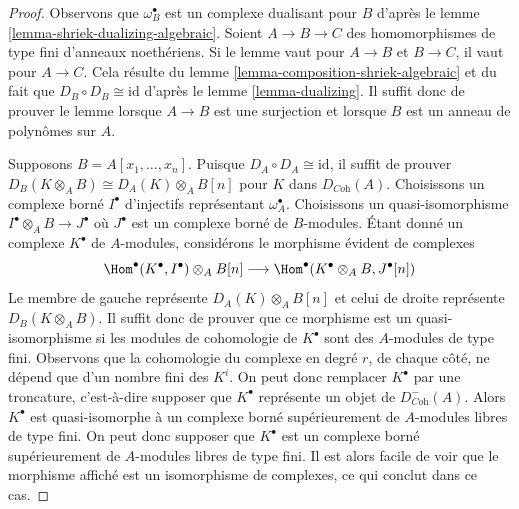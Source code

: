 \begin{proof}
Observons que $\omega_B^\bullet$ est un complexe dualisant pour $B$ d'après le lemme \ref{lemma-shriek-dualizing-algebraic}.
Soient $A \to B \to C$ des homomorphismes de type fini d'anneaux noethériens.
Si le lemme vaut pour $A \to B$ et $B \to C$, il vaut pour $A \to C$.
Cela résulte du lemme \ref{lemma-composition-shriek-algebraic} et du fait que $D_B \circ D_B \cong \text{id}$ d'après le lemme \ref{lemma-dualizing}.
Il suffit donc de prouver le lemme lorsque $A \to B$ est une surjection
et lorsque $B$ est un anneau de polynômes sur $A$.

\medskip\noindent
Supposons $B = A[x_1, \ldots, x_n]$. Puisque $D_A \circ D_A \cong \text{id}$, il suffit de prouver
$D_B(K \otimes_A B) \cong D_A(K) \otimes_A B[n]$ pour $K$ dans $D_{\textit{Coh}}(A)$.
Choisissons un complexe borné $I^\bullet$ d'injectifs représentant $\omega_A^\bullet$.
Choisissons un quasi-isomorphisme $I^\bullet \otimes_A B \to J^\bullet$ où $J^\bullet$
est un complexe borné de $B$-modules.
Étant donné un complexe $K^\bullet$ de $A$-modules,
considérons le morphisme évident de complexes
$$
\Hom^\bullet(K^\bullet, I^\bullet) \otimes_A B[n]
\longrightarrow
\Hom^\bullet(K^\bullet \otimes_A B, J^\bullet[n])
$$
Le membre de gauche représente $D_A(K) \otimes_A B[n]$ et celui de droite représente $D_B(K \otimes_A B)$.
Il suffit donc de prouver que ce morphisme est un quasi-isomorphisme
si les modules de cohomologie de $K^\bullet$ sont des $A$-modules de type fini.
Observons que la cohomologie du complexe en degré $r$,
de chaque côté, ne dépend que d'un nombre fini des $K^i$.
On peut donc remplacer $K^\bullet$ par une troncature, c'est-à-dire supposer
que $K^\bullet$ représente un objet de $D^-_{\textit{Coh}}(A)$.
Alors $K^\bullet$ est quasi-isomorphe à un complexe borné supérieurement
de $A$-modules libres de type fini.
On peut donc supposer que $K^\bullet$ est un complexe borné supérieurement
de $A$-modules libres de type fini.
Il est alors facile de voir que le morphisme affiché est
un isomorphisme de complexes, ce qui conclut dans ce cas.


\end{proof}
